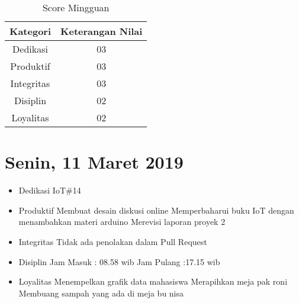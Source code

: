 \begin{table}[h]
\caption{Score Mingguan}
\centering
\begin{tabular}{|c|c|}
\hline
\textbf{Kategori}&\textbf{Keterangan Nilai}\\
\hline
Dedikasi&03\\
\hline
Produktif&03\\
\hline
Integritas&03\\
\hline
Disiplin&02\\
\hline
Loyalitas&02\\
\hline
\end{tabular}
\label{table:score mingguan}
\end{table}

\section{Senin, 11 Maret 2019}
\begin{itemize}
\item Dedikasi
\subitem IoT\#14
\item Produktif
  \subitem Membuat desain diskusi online
  \subitem Memperbaharui buku IoT dengan menambahkan materi arduino
  \subitem Merevisi laporan proyek 2
\item Integritas
  \subitem Tidak ada penolakan dalam Pull Request
\item Disiplin
  \subitem Jam Masuk : 08.58 wib
  \subitem Jam Pulang :17.15 wib
\item Loyalitas
  \subitem Menempelkan grafik data mahasiswa
  \subitem Merapihkan meja pak roni
  \subitem Membuang sampah yang ada di meja bu nisa
\end{itemize}



